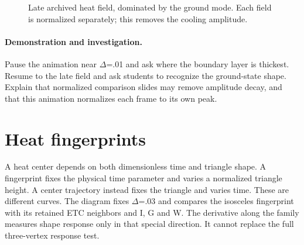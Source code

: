 \documentclass[11pt,oneside,openany]{book}
\begin{document}
\begin{figure}[htbp]
\caption[Late archived heat field, dominated by the ground mode]{Late archived heat field, dominated by the ground mode. Each field is normalized separately; this removes the cooling amplitude.}\label{fig:heat-H1.0}
\end{figure}

\paragraph{Demonstration and investigation.} Pause the animation near \ensuremath{\Delta}=.01 and ask where the boundary layer is thickest. Resume to the late field and ask students to recognize the ground-state shape. Explain that normalized comparison slides may remove amplitude decay, and that this animation normalizes each frame to its own peak.


\section{Heat fingerprints}\label{sec:slide66}

A heat center depends on both dimensionless time and triangle shape. A fingerprint fixes the physical time parameter and varies a normalized triangle height. A center trajectory instead fixes the triangle and varies time. These are different curves. The diagram fixes \ensuremath{\Delta}=.03 and compares the isosceles fingerprint with its retained ETC neighbors and I, G and W. The derivative along the family measures shape response only in that special direction. It cannot replace the full three-vertex response test.
\end{document}
